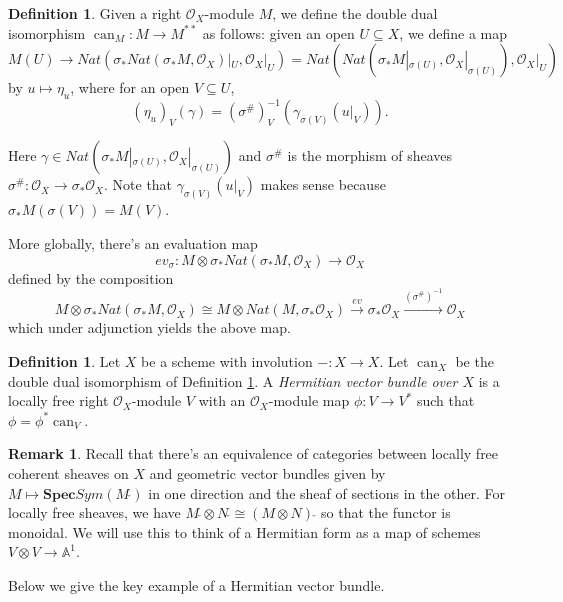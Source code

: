 \documentclass[edeposit,fullpage]{uiucthesis2009}
\newcommand{\mbb}{\mathbb}
\newcommand{\mc}{\mathcal}
\newcommand{\dual}{\,\check{}}
\DeclareMathOperator{\can}{can}
\theoremstyle{plain}
\numberwithin{lemma}{section}
\theoremstyle{definition}
\newtheorem{definition}[lemma]{Definition}
\newtheorem{remark}[lemma]{Remark}
\begin{document}
\begin{definition}\label{def:double_dual_iso}
Given a right $\mc O_X$-module $M$, we define the double dual
isomorphism $\can_M : M \rightarrow M^{**}$ as follows: given an open $U
\subseteq X$, we define a map
\[
M(U) \rightarrow Nat(\sigma_* Nat(\sigma_* M,\mc O_X)|_U, \mc O_X|_U)
= Nat(Nat(\sigma_* M|_{\sigma(U)}, \mc O_X|_{\sigma(U)}),\mc O_X|_U)
\]
by $u \mapsto \eta_u$, where for an open $V \subseteq U$,
\[
(\eta_u)_V(\gamma) = (\sigma^\#)_{V}^{-1}(\gamma_{\sigma(V)}(u|_V)).
\]

Here $\gamma \in Nat(\sigma_* M|_{\sigma(U)}, \mc
O_X|_{\sigma(U)})$ and $\sigma^\#$ is the morphism of sheaves
$\sigma^\# : \mc O_X \rightarrow \sigma_* \mc O_X$. Note that $\gamma_{\sigma(V)}(u|_V)$ makes sense
because $\sigma_*M(\sigma(V)) = M(V)$.

More globally, there's an evaluation map
\[
ev_\sigma : M \otimes \sigma_*Nat(\sigma_*M,\mc O_X) \rightarrow \mc O_X
\]
defined by the composition
\[
M \otimes \sigma_*Nat(\sigma_*M,\mc O_X) \cong M \otimes
Nat(M,\sigma_*\mc O_X) \xrightarrow{ ev} \sigma_* \mc O_X
\xrightarrow{(\sigma^\#)^{-1}} \mc O_X
\]
which under adjunction yields the above map. 
\end{definition}

\begin{definition}\label{def:herm_form_sch}
Let $X$ be a scheme with involution $- : X \rightarrow X$. Let
$\can_X$ be the double dual isomorphism of Definition \ref{def:double_dual_iso}. A
\emph{Hermitian vector bundle over $X$} is a locally free right $\mc
O_X$-module $V$ with an $\mc O_X$-module map $\phi : V \rightarrow
V^*$ such that $\phi = \phi^*\can_V$.
\end{definition}

\begin{remark}
  Recall that there's an equivalence of categories between locally
  free coherent sheaves on $X$ and geometric vector bundles given by
  $M \mapsto \mathbf{Spec}Sym(M\dual)$ in one direction and the sheaf
  of sections in the other. For locally free sheaves, we have $M\dual
  \otimes N\dual \cong (M \otimes N)\dual$ so that the functor is
  monoidal. We will use this to think of a Hermitian
  form as a map of schemes $V \otimes V \rightarrow \mbb A^1$.
\end{remark}

Below we give the key example of a Hermitian vector bundle.
\end{document}
